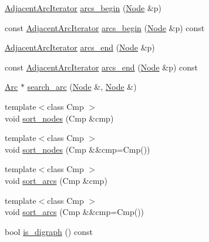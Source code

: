 \begin{DoxyCompactItemize}
\item 
\hyperlink{class_designar_1_1_graph_1_1_adjacent_arc_iterator}{Adjacent\+Arc\+Iterator} \hyperlink{class_designar_1_1_graph_a9488f4193d227a690f46e91a11dd830a}{arcs\+\_\+begin} (\hyperlink{class_designar_1_1_graph_a5dfc7dba9d092ac489c72e40390c37d0}{Node} \&p)
\item 
const \hyperlink{class_designar_1_1_graph_1_1_adjacent_arc_iterator}{Adjacent\+Arc\+Iterator} \hyperlink{class_designar_1_1_graph_a2c527f6bddb0ff454fd6139f2437c27b}{arcs\+\_\+begin} (\hyperlink{class_designar_1_1_graph_a5dfc7dba9d092ac489c72e40390c37d0}{Node} \&p) const
\item 
\hyperlink{class_designar_1_1_graph_1_1_adjacent_arc_iterator}{Adjacent\+Arc\+Iterator} \hyperlink{class_designar_1_1_graph_a68ee235ab79790c00e1a69d518b9c076}{arcs\+\_\+end} (\hyperlink{class_designar_1_1_graph_a5dfc7dba9d092ac489c72e40390c37d0}{Node} \&p)
\item 
const \hyperlink{class_designar_1_1_graph_1_1_adjacent_arc_iterator}{Adjacent\+Arc\+Iterator} \hyperlink{class_designar_1_1_graph_a305a413007d60401317366c92245bfa4}{arcs\+\_\+end} (\hyperlink{class_designar_1_1_graph_a5dfc7dba9d092ac489c72e40390c37d0}{Node} \&p) const
\item 
\hyperlink{class_designar_1_1_graph_a74c730ef4ce2d20f998d72bd25c2b5bf}{Arc} $\ast$ \hyperlink{class_designar_1_1_graph_afa69dd3cc6bacfed22864f5ad7c189ba}{search\+\_\+arc} (\hyperlink{class_designar_1_1_graph_a5dfc7dba9d092ac489c72e40390c37d0}{Node} \&, \hyperlink{class_designar_1_1_graph_a5dfc7dba9d092ac489c72e40390c37d0}{Node} \&)
\item 
{\footnotesize template$<$class Cmp $>$ }\\void \hyperlink{class_designar_1_1_graph_afcdce423516a879b23ec1b0fed201f20}{sort\+\_\+nodes} (Cmp \&cmp)
\item 
{\footnotesize template$<$class Cmp $>$ }\\void \hyperlink{class_designar_1_1_graph_af40e0d87cdc7222b2f02e833bf791ac9}{sort\+\_\+nodes} (Cmp \&\&cmp=Cmp())
\item 
{\footnotesize template$<$class Cmp $>$ }\\void \hyperlink{class_designar_1_1_graph_a39af536f6e08248e0d343dcd300713c2}{sort\+\_\+arcs} (Cmp \&cmp)
\item 
{\footnotesize template$<$class Cmp $>$ }\\void \hyperlink{class_designar_1_1_graph_a37b5e36c96bf9efe44a0d6b83feb9656}{sort\+\_\+arcs} (Cmp \&\&cmp=Cmp())
\item 
bool \hyperlink{class_designar_1_1_graph_af0e0b3d1d6a52e0f3d3225f1fa274211}{is\+\_\+digraph} () const
\end{DoxyCompactItemize}

